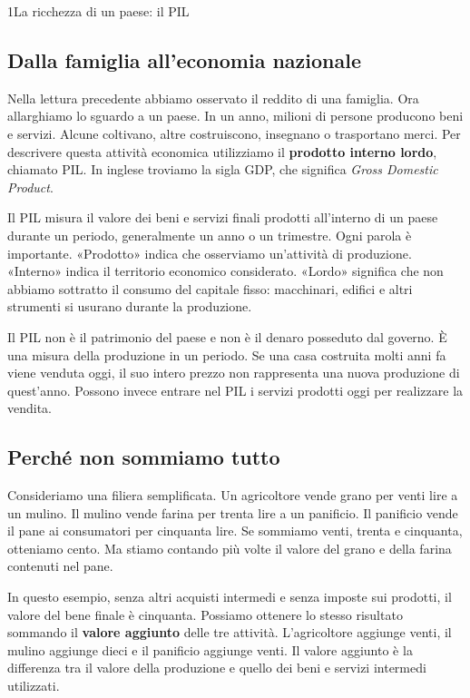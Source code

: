 \begin{lettura}{1}{La ricchezza di un paese: il PIL}


\subsection*{Dalla famiglia all'economia nazionale}
Nella lettura precedente abbiamo osservato il reddito di una famiglia. Ora allarghiamo lo sguardo a un paese. In un anno, milioni di persone producono beni e servizi. Alcune coltivano, altre costruiscono, insegnano o trasportano merci. Per descrivere questa attività economica utilizziamo il \textbf{prodotto interno lordo}, chiamato PIL. In inglese troviamo la sigla GDP, che significa \emph{Gross Domestic Product}.

Il PIL misura il valore dei beni e servizi finali prodotti all'interno di un paese durante un periodo, generalmente un anno o un trimestre. Ogni parola è importante. «Prodotto» indica che osserviamo un'attività di produzione. «Interno» indica il territorio economico considerato. «Lordo» significa che non abbiamo sottratto il consumo del capitale fisso: macchinari, edifici e altri strumenti si usurano durante la produzione.

Il PIL non è il patrimonio del paese e non è il denaro posseduto dal governo. È una misura della produzione in un periodo. Se una casa costruita molti anni fa viene venduta oggi, il suo intero prezzo non rappresenta una nuova produzione di quest'anno. Possono invece entrare nel PIL i servizi prodotti oggi per realizzare la vendita.

\subsection*{Perché non sommiamo tutto}
Consideriamo una filiera semplificata. Un agricoltore vende grano per venti lire a un mulino. Il mulino vende farina per trenta lire a un panificio. Il panificio vende il pane ai consumatori per cinquanta lire. Se sommiamo venti, trenta e cinquanta, otteniamo cento. Ma stiamo contando più volte il valore del grano e della farina contenuti nel pane.

In questo esempio, senza altri acquisti intermedi e senza imposte sui prodotti, il valore del bene finale è cinquanta. Possiamo ottenere lo stesso risultato sommando il \textbf{valore aggiunto} delle tre attività. L'agricoltore aggiunge venti, il mulino aggiunge dieci e il panificio aggiunge venti. Il valore aggiunto è la differenza tra il valore della produzione e quello dei beni e servizi intermedi utilizzati.


\end{lettura}
